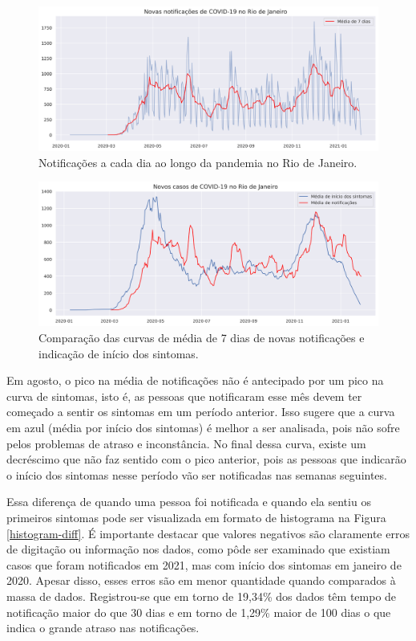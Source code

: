\begin{figure}[!ht]
    \centering
    \includegraphics[width = \textwidth]
    {../images/new-notifications-rio.png}
    \caption{Notificações a cada dia ao longo da pandemia no Rio de Janeiro.}
    \label{new-notifications}
\end{figure}

\begin{figure}[!ht]
    \centering
    \includegraphics[width = \textwidth]{../images/comparing-symptoms-notifications.png}
    \caption{Comparação das curvas de média de 7 dias de novas notificações e indicação de início dos sintomas.}
    \label{notifications-vs-symptoms}
\end{figure}

Em agosto, o pico na média de notificações não é antecipado por um pico na curva de sintomas, isto é, as pessoas que notificaram esse mês devem ter começado a sentir os sintomas em um período anterior. 
Isso sugere que a curva em azul (média por início dos sintomas) é melhor a ser analisada, pois não sofre pelos problemas de atraso e inconstância. 
No final dessa curva, existe um decréscimo que não faz sentido com o pico anterior, pois as pessoas que indicarão o início dos sintomas nesse período vão ser notificadas nas semanas seguintes. 

Essa diferença de quando uma pessoa foi notificada e quando ela sentiu os primeiros sintomas pode ser visualizada em formato de histograma na Figura \ref{histogram-diff}. 
É importante destacar que valores negativos são claramente erros de digitação ou informação nos dados, como pôde ser examinado que existiam casos que foram notificados em 2021, mas com início dos sintomas em janeiro de 2020. 
Apesar disso, esses erros são em menor quantidade quando comparados à massa de dados. 
Registrou-se que em torno de 19,34\% dos dados têm tempo de notificação maior do que 30 dias e em torno de 1,29\% maior de 100 dias o que indica o grande atraso nas notificações.

